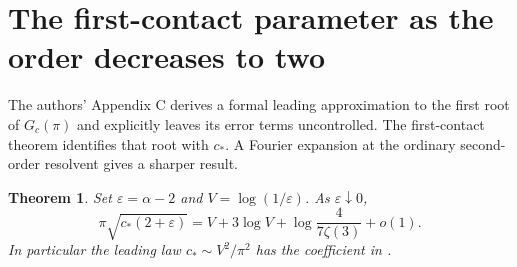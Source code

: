 \documentclass[11pt]{article}
\theoremstyle{plain}\newtheorem{theorem}{Theorem}[section]\newtheorem{lemma}[theorem]{Lemma}\newtheorem{corollary}[theorem]{Corollary}\newtheorem{proposition}[theorem]{Proposition}
\numberwithin{equation}{section}
\begin{document}
\section{The first-contact parameter as the order decreases to two}
The authors' Appendix C derives a formal leading approximation to the first root of $G_c(\pi)$ and explicitly leaves its error terms uncontrolled. The first-contact theorem identifies that root with $c_*$. A Fourier expansion at the ordinary second-order resolvent gives a sharper result.
\begin{theorem}\label{threshold-asym}
Set $\varepsilon=\alpha-2$ and $V=\log(1/\varepsilon)$. As $\varepsilon\downarrow0$,
\[
 \pi\sqrt{c_*(2+\varepsilon)}=V+3\log V+\log\!\frac{4}{7\zeta(3)}+o(1).
\]
In particular the leading law $c_*\sim V^2/\pi^2$ has the coefficient in \cite[Appendix C, (C.7)]{lp}.
\end{theorem}
\end{document}
